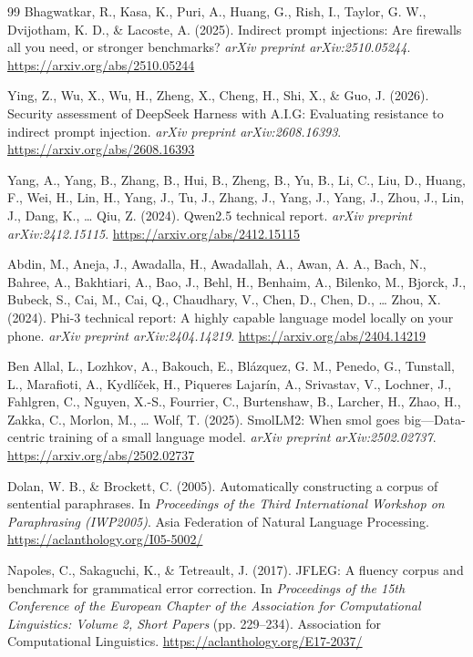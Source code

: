 \documentclass{BVP_AISC}
\begin{document}
\begin{thebibliography}{99}
 Bhagwatkar, R., Kasa, K., Puri, A., Huang, G., Rish, I., Taylor, G. W., Dvijotham, K. D., \& Lacoste, A. (2025). Indirect prompt injections: Are firewalls all you need, or stronger benchmarks? \textit{arXiv preprint arXiv:2510.05244}. \url{https://arxiv.org/abs/2510.05244}

 Ying, Z., Wu, X., Wu, H., Zheng, X., Cheng, H., Shi, X., \& Guo, J. (2026). Security assessment of DeepSeek Harness with A.I.G: Evaluating resistance to indirect prompt injection. \textit{arXiv preprint arXiv:2608.16393}. \url{https://arxiv.org/abs/2608.16393}

 Yang, A., Yang, B., Zhang, B., Hui, B., Zheng, B., Yu, B., Li, C., Liu, D., Huang, F., Wei, H., Lin, H., Yang, J., Tu, J., Zhang, J., Yang, J., Yang, J., Zhou, J., Lin, J., Dang, K., \ldots{} Qiu, Z. (2024). Qwen2.5 technical report. \textit{arXiv preprint arXiv:2412.15115}. \url{https://arxiv.org/abs/2412.15115}

 Abdin, M., Aneja, J., Awadalla, H., Awadallah, A., Awan, A. A., Bach, N., Bahree, A., Bakhtiari, A., Bao, J., Behl, H., Benhaim, A., Bilenko, M., Bjorck, J., Bubeck, S., Cai, M., Cai, Q., Chaudhary, V., Chen, D., Chen, D., \ldots{} Zhou, X. (2024). Phi-3 technical report: A highly capable language model locally on your phone. \textit{arXiv preprint arXiv:2404.14219}. \url{https://arxiv.org/abs/2404.14219}

 Ben Allal, L., Lozhkov, A., Bakouch, E., Bl\'azquez, G. M., Penedo, G., Tunstall, L., Marafioti, A., Kydl\'i\v{c}ek, H., Piqueres Lajar\'in, A., Srivastav, V., Lochner, J., Fahlgren, C., Nguyen, X.-S., Fourrier, C., Burtenshaw, B., Larcher, H., Zhao, H., Zakka, C., Morlon, M., \ldots{} Wolf, T. (2025). SmolLM2: When smol goes big---Data-centric training of a small language model. \textit{arXiv preprint arXiv:2502.02737}. \url{https://arxiv.org/abs/2502.02737}

 Dolan, W. B., \& Brockett, C. (2005). Automatically constructing a corpus of sentential paraphrases. In \textit{Proceedings of the Third International Workshop on Paraphrasing (IWP2005)}. Asia Federation of Natural Language Processing. \url{https://aclanthology.org/I05-5002/}

 Napoles, C., Sakaguchi, K., \& Tetreault, J. (2017). JFLEG: A fluency corpus and benchmark for grammatical error correction. In \textit{Proceedings of the 15th Conference of the European Chapter of the Association for Computational Linguistics: Volume 2, Short Papers} (pp. 229--234). Association for Computational Linguistics. \url{https://aclanthology.org/E17-2037/}


\end{thebibliography}
\end{document}
